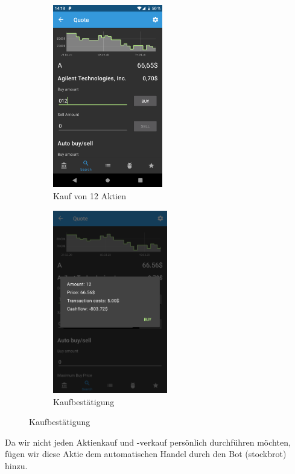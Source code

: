 \documentclass[a4paper]{article}
\begin{document}
\begin{figure}[H]
	\begin{subfigure}{.5\textwidth}
		\centering
		\includegraphics[height=8cm,keepaspectratio]{./images/demo/buy_a.png}
		\caption{Kauf von 12 Aktien}
		\label{fig:demo:buy_a}
	\end{subfigure}
	\begin{subfigure}{.5\textwidth}
		\centering
		\includegraphics[height=8cm,keepaspectratio]{./images/demo/buy_a_confirm.png}
		\caption{Kaufbestätigung}
		\label{fig:demo:buy_a_confirm}
	\end{subfigure}
\end{figure}

Da wir nicht jeden Aktienkauf und -verkauf persönlich durchführen möchten, fügen wir diese Aktie dem automatischen Handel durch den Bot (stockbrot) hinzu. 
\end{document}
